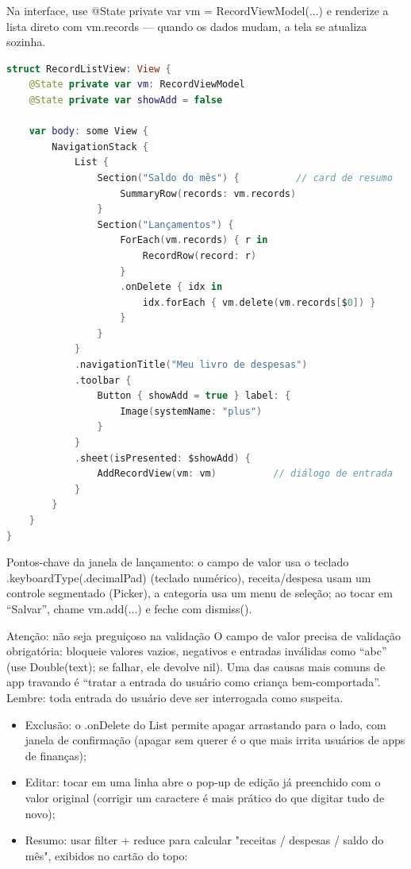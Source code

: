 Na interface, use @State private var vm = RecordViewModel(...) e renderize a lista direto com vm.records — quando os dados mudam, a tela se atualiza sozinha.


\begin{lstlisting}[language=Swift]
struct RecordListView: View {
    @State private var vm: RecordViewModel
    @State private var showAdd = false

    var body: some View {
        NavigationStack {
            List {
                Section("Saldo do mês") {          // card de resumo
                    SummaryRow(records: vm.records)
                }
                Section("Lançamentos") {
                    ForEach(vm.records) { r in
                        RecordRow(record: r)
                    }
                    .onDelete { idx in
                        idx.forEach { vm.delete(vm.records[$0]) }
                    }
                }
            }
            .navigationTitle("Meu livro de despesas")
            .toolbar {
                Button { showAdd = true } label: {
                    Image(systemName: "plus")
                }
            }
            .sheet(isPresented: $showAdd) {
                AddRecordView(vm: vm)          // diálogo de entrada
            }
        }
    }
}
\end{lstlisting}

Pontos-chave da janela de lançamento: o campo de valor usa o teclado .keyboardType(.decimalPad) (teclado numérico), receita/despesa usam um controle segmentado (Picker), a categoria usa um menu de seleção; ao tocar em “Salvar”, chame vm.add(...) e feche com dismiss().

\begin{tcbwarn}{Atenção: não seja preguiçoso na validação}
O campo de valor precisa de validação obrigatória: bloqueie valores vazios, negativos e entradas inválidas como “abc” (use Double(text); se falhar, ele devolve nil). Uma das causas mais comuns de app travando é “tratar a entrada do usuário como criança bem-comportada”. Lembre: toda entrada do usuário deve ser interrogada como suspeita.

\end{tcbwarn}


\begin{itemize}
  \item Exclusão: o .onDelete do List permite apagar arrastando para o lado, com janela de confirmação (apagar sem querer é o que mais irrita usuários de apps de finanças);
  \item Editar: tocar em uma linha abre o pop-up de edição já preenchido com o valor original (corrigir um caractere é mais prático do que digitar tudo de novo);
  \item Resumo: usar filter + reduce para calcular "receitas / despesas / saldo do mês", exibidos no cartão do topo:
\end{itemize}

